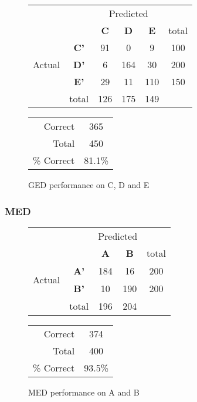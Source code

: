 \begin{figure}[!ht]
\begin{minipage}[b]{0.5\linewidth}
\centering
	\begin{tabular}{ccc|c|c|c}
	 & &\multicolumn{3}{c}{Predicted} &\\
	  & & \bf{C} &  \bf{D} & \bf{E} & total \\
	 \cline{3-5}
	 \multirow{3}{*}{\begin{sideways}Actual\end{sideways}} & \bf{C'}& 91 & 0 & 9 & 100\\
	 \cline{3-6}
	 & \bf{D'}& 6 & 164 & 30 & 200\\
	  \cline{3-6}
	 & \bf{E'}& 29 & 11 & 110 &  150\\
	  \cline{3-6}
	 &total&126&175&149\\
	\end{tabular}
\end{minipage}
\hspace{0.5cm}
\begin{minipage}[b]{0.5\linewidth}
	\begin{tabular}{r|c}
	\hline
	Correct& 365\\
	Total& 450\\
	\hline
	\% Correct& 81.1\%\\
	\hline
	\end{tabular}
\end{minipage}
\vspace{1mm}
\caption{GED performance on C, D and E}
\end{figure}


\subsubsection{MED}
\begin{figure}[!ht]
\begin{minipage}[b]{0.5\linewidth}
\centering
	\begin{tabular}{ccc|c|c}
	 & &\multicolumn{2}{c}{Predicted} &\\
	  & & \bf{A} &  \bf{B} & total \\
	 \cline{3-5}
	 \multirow{2}{*}{\begin{sideways}Actual\end{sideways}} & \bf{A'}& 184 & 16 & 200 \\
	 \cline{3-5}
	 & \bf{B'}& 10 & 190 & 200 \\
	  \cline{3-5}
	 &total&196&204&\\
	\end{tabular}
\end{minipage}
\hspace{0.5cm}
\begin{minipage}[b]{0.5\linewidth}
	\begin{tabular}{r|c}
	\hline
	Correct& 374\\
	Total& 400\\
	\hline
	\% Correct& 93.5\%\\
	\hline
	\end{tabular}
\end{minipage}
\vspace{1mm}
\caption{MED performance on A and B}
\end{figure}


